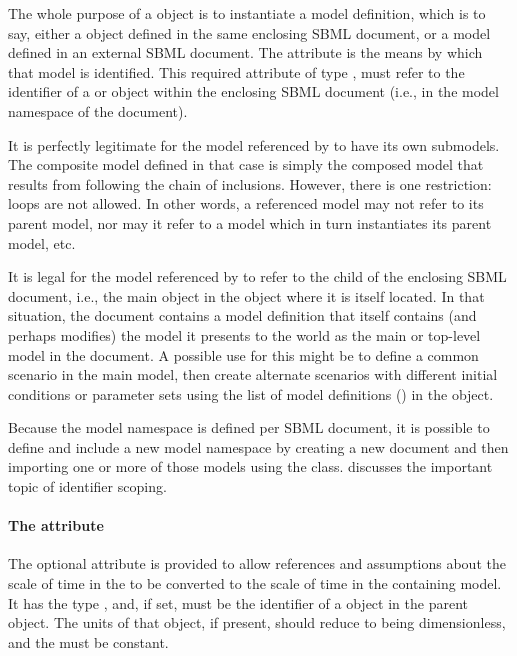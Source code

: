 The whole purpose of a \Submodel object is to instantiate a model
definition, which is to say, either a \Model object defined in the same
enclosing SBML document, or a model defined in an external SBML
document.  The  attribute is the means by which that
model is identified.  This required attribute of type ,
must refer to the identifier of a \Model or \ExternalModelDefinition
object within the enclosing SBML document (i.e., in the model namespace
of the document).

It is perfectly legitimate for the model referenced by 
to have its own submodels.  The composite model defined in that case is
simply the composed model that results from following the chain of
inclusions.  However, there is one restriction: loops are not allowed.
In other words, a referenced model may not refer to its parent model,
nor may it refer to a model which in turn instantiates its parent model,
etc.

It is legal for the model referenced by  to refer to the
 child of the enclosing SBML document, i.e., the main
\Model object in the \SBML object where it is itself located.  In that
situation, the document contains a model definition that itself contains
(and perhaps modifies) the model it presents to the world as the main or
top-level model in the document.  A possible use for this might be to
define a common scenario in the main model, then create alternate
scenarios with different initial conditions or parameter sets using the
list of model definitions () in the \SBML
object.

Because the model namespace is defined per SBML document, it is possible
to define and include a new model namespace by creating a new document
and then importing one or more of those models using the
\ExternalModelDefinition class.   discusses the
important topic of identifier scoping.


\paragraph{The \fixttspace{} attribute}
\label{submodel-timeconversionfactor}

The optional  attribute is provided to allow
references and assumptions about the scale of time in the \Submodel to be converted to 
the scale of time in the containing model.  It has the type ,
and, if set, must be the identifier of a \Parameter object in the 
parent \Model object.  The units of that \Parameter object, if present,
should reduce to being dimensionless, and the \Parameter must be constant.

